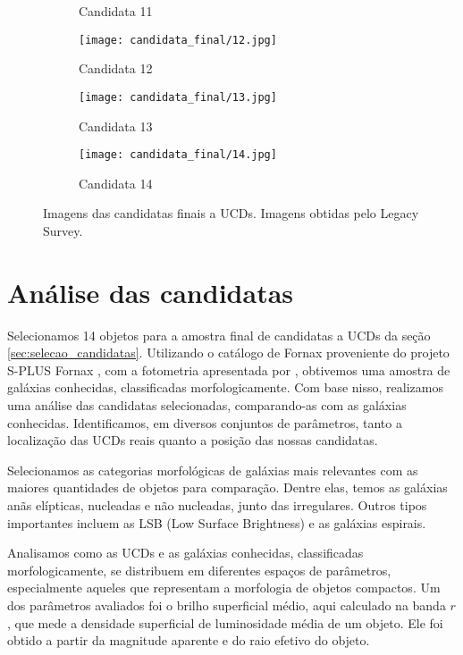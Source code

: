 \begin{figure}[!ht]
\begin{subfigure}[b]{0.25\textwidth}
        \caption{Candidata 11}
    \end{subfigure}
    \begin{subfigure}[b]{0.25\textwidth}
        \texttt{[image: candidata\_final/12.jpg]}
        \caption{Candidata 12}
    \end{subfigure}
    \begin{subfigure}[b]{0.25\textwidth}
        \texttt{[image: candidata\_final/13.jpg]}
        \caption{Candidata 13}
    \end{subfigure}
    \begin{subfigure}[b]{0.25\textwidth}
        \texttt{[image: candidata\_final/14.jpg]}
        \caption{Candidata 14}
    \end{subfigure}
    \caption[]{Imagens das candidatas finais a UCDs. Imagens obtidas pelo Legacy Survey.}
    \label{ucds_candidates_final_imagens}
\end{figure}



\section{Análise das candidatas}\label{sec:analise_candidatas}
Selecionamos 14 objetos para a amostra final de candidatas a UCDs da seção \ref{sec:selecao_candidatas}. Utilizando o catálogo de Fornax proveniente do projeto S-PLUS Fornax \citep{castelli2024splusfornaxprojectsfp}, com a fotometria apresentada por \citep{haack2024splusfornaxprojectsfp}, obtivemos uma amostra de galáxias conhecidas, classificadas morfologicamente. Com base nisso, realizamos uma análise das candidatas selecionadas, comparando-as com as galáxias conhecidas. Identificamos, em diversos conjuntos de parâmetros, tanto a localização das UCDs reais quanto a posição das nossas candidatas.

Selecionamos as categorias morfológicas de galáxias mais relevantes com as maiores quantidades de objetos para comparação. Dentre elas, temos as galáxias anãs elípticas, nucleadas e não nucleadas, junto das irregulares. Outros tipos importantes incluem as LSB (Low Surface Brightness) e as galáxias espirais.

Analisamos como as UCDs e as galáxias conhecidas, classificadas morfologicamente, se distribuem em diferentes espaços de parâmetros, especialmente aqueles que representam a morfologia de objetos compactos. Um dos parâmetros avaliados foi o brilho superficial médio, aqui calculado na banda $r$, que mede a densidade superficial de luminosidade média de um objeto. Ele foi obtido a partir da magnitude aparente e do raio efetivo do objeto.

